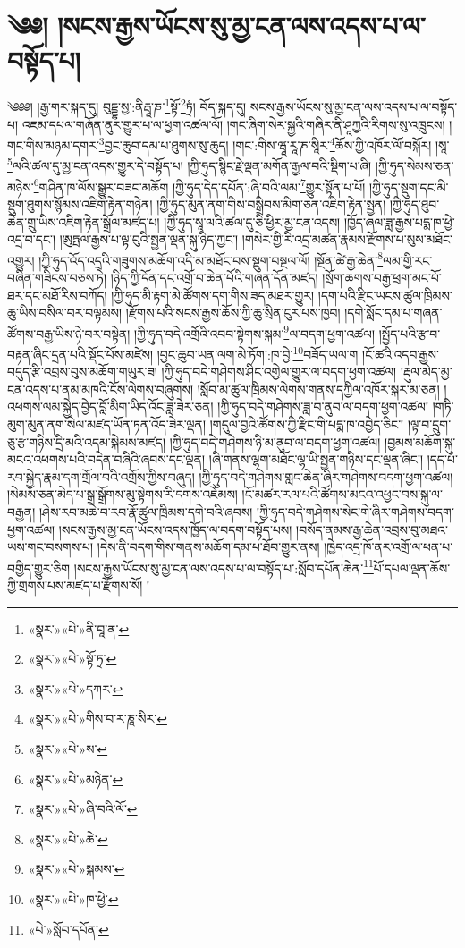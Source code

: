 \chapter{༄༅། །སངས་རྒྱས་ཡོངས་སུ་མྱ་ངན་ལས་འདས་པ་ལ་བསྟོད་པ།}༄༅༅། །རྒྱ་གར་སྐད་དུ། བུདྡྷ་སྱ་:ནིརྦཱ་ཎ་\footnote{«སྣར་»«པེ་»ནི་བཱ་ན་}སྟོ་\footnote{«སྣར་»«པེ་»སྟོ་ཏྲ་}ཏྲཾ། བོད་སྐད་དུ། སངས་རྒྱས་ཡོངས་སུ་མྱ་ངན་ལས་འདས་པ་ལ་བསྟོད་པ། འཇམ་དཔལ་གཞོན་ནུར་གྱུར་པ་ལ་ཕྱག་འཚལ་ལོ། །གང་ཞིག་སེར་སྐྱའི་གཞིར་ནི་ཤཱཀྱའི་རིགས་སུ་འཁྲུངས། །གང་གིས་མཉམ་དགར་\footnote{«སྣར་»«པེ་»དཀར་}བྱང་ཆུབ་དམ་པ་ཐུགས་སུ་ཆུད། །གང་:གིས་ཝཱ་རཱ་ཎ་སཱིར་\footnote{«སྣར་»«པེ་»གིས་བ་ར་ཎཱ་སིར་}ཆོས་ཀྱི་འཁོར་ལོ་བསྐོར། །སཱ་\footnote{«སྣར་»«པེ་»ས་}ལའི་ཚལ་དུ་མྱ་ངན་འདས་གྱུར་དེ་བསྟོད་པ། །ཀྱི་ཧུད་སྙིང་རྗེ་ལྡན་མགོན་རྒྱལ་བའི་སྡིག་པ་ཞི། །ཀྱི་ཧུད་སེམས་ཅན་མཉེས་\footnote{«སྣར་»«པེ་»མཉེན་}གཤིན་ཁ་ལོས་སྒྱུར་བཟང་མཆོག །ཀྱི་ཧུད་དེད་དཔོན་:ཞི་བའི་ལམ་\footnote{«སྣར་»«པེ་»ཞི་བའི་ལོ་}གྱུར་སྟོན་པ་པོ། །ཀྱི་ཧུད་སྡུག་དང་མི་སྡུག་ཐུགས་སྙོམས་འཇིག་རྟེན་གཉེན། །ཀྱི་ཧུད་མུན་ནག་གིས་བསྒྲིབས་མིག་ཅན་འཇིག་རྟེན་སྤྱན། །ཀྱི་ཧུད་ཐུབ་ཆེན་གྲུ་ཡིས་འཇིག་རྟེན་སྒྲོལ་མཛད་པ། །ཀྱི་ཧུད་སཱ་ལའི་ཚལ་དུ་ཅི་ཕྱིར་མྱ་ངན་འདས། །ཁྱོད་ཞལ་ཟླ་རྒྱས་པདྨ་ཁ་ཕྱེ་འདྲ་བ་དང་། །ཨུཏྤལ་རྒྱས་པ་ལྟ་བུའི་སྤྱན་ལྡན་སྐུ་ཉིད་ཀྱང་། །གསེར་གྱི་རི་འདྲ་མཚན་རྣམས་རྫོགས་པ་སུས་མཐོང་འགྱུར། །ཀྱི་ཧུད་འོད་འདྲའི་གཟུགས་མཆོག་འདི་མ་མཐོང་བས་སྡུག་བསྔལ་ལོ། །སྔོན་ཚེ་རྒྱ་ཆེན་\footnote{«སྣར་»«པེ་»ཆེ་}ལམ་གྱི་རང་བཞིན་གཟིངས་བཅས་ཏེ། །ཉིད་ཀྱི་དོན་དང་འགྲོ་བ་ཆེན་པོའི་གཞན་དོན་མཛད། །སྲོག་ཆགས་བརྒྱ་ཕྲག་མང་པོ་ཐར་དང་མཐོ་རིས་བཀོད། །ཀྱི་ཧུད་མི་རྟག་མེ་ཚོགས་དག་གིས་ཟད་མཐར་གྱུར། །དག་པའི་རྫིང་ཡངས་ཚུལ་ཁྲིམས་ཆུ་ཡིས་བསིལ་བར་བལྟམས། །རྫོགས་པའི་སངས་རྒྱས་ཆོས་ཀྱི་ཆུ་སྲིན་ངུར་པས་ཁྱབ། །དགེ་སློང་དམ་པ་གཞན་ཚོགས་བརྒྱ་ཡིས་ཉེ་བར་བསྟེན། །ཀྱི་ཧུད་བདེ་འགྲོའི་འབབ་སྟེགས་སྐམ་\footnote{«སྣར་»«པེ་»སྐམས་}ལ་བདག་ཕྱག་འཚལ། །སྤྱོད་པའི་རྩ་བ་བརྟན་ཞིང་དྲན་པའི་སྡོང་པོས་མཛེས། །བྱང་ཆུབ་ཡན་ལག་མེ་ཏོག་:ཁ་བྱེ་\footnote{«སྣར་»«པེ་»ཁ་ཕྱེ་}བཟོད་ཡལ་ག །ངོ་ཚའི་འདབ་རྒྱས་བདུད་རྩི་འབྲས་བུས་མཆོག་གཡུར་ཟ། །ཀྱི་ཧུད་བདེ་གཤེགས་ཤིང་འགྱེལ་གྱུར་ལ་བདག་ཕྱག་འཚལ། །རྡུལ་མེད་མྱ་ངན་འདས་པ་ནམ་མཁའི་ངོས་ལེགས་བཞུགས། །སློབ་མ་ཚུལ་ཁྲིམས་ལེགས་གནས་དཀྱིལ་འཁོར་སྐར་མ་ཅན། །འཕགས་ལམ་སྐྱེད་བྱེད་བློ་མིག་ཡིད་འོང་ཟླ་ཟེར་ཅན། །ཀྱི་ཧུད་བདེ་གཤེགས་ཟླ་བ་ནུབ་ལ་བདག་ཕྱག་འཚལ། །གཏི་མུག་མུན་ནག་སེལ་མཛད་ཡོན་ཏན་འོད་ཟེར་ལྡན། །གདུལ་བྱའི་ཚོགས་ཀྱི་རྫིང་གི་པདྨ་ཁ་འབྱེད་ཅིང་། །ལྟ་བ་དྲུག་ཅུ་རྩ་གཉིས་དྲི་མའི་འདམ་སྐེམས་མཛད། །ཀྱི་ཧུད་བདེ་གཤེགས་ཉི་མ་ནུབ་ལ་བདག་ཕྱག་འཚལ། །བྱམས་མཆོག་སྐུ་མངའ་འཕགས་པའི་བདེན་བཞིའི་ཞབས་དང་ལྡན། །ཞི་གནས་ལྷག་མཐོང་ལྷ་ཡི་སྤྱན་གཉིས་དང་ལྡན་ཞིང་། །དད་པ་རབ་སྐྱེད་རྣམ་དག་གྲོལ་བའི་འགྲོས་ཀྱིས་བཞུད། །ཀྱི་ཧུད་བདེ་གཤེགས་གླང་ཆེན་ཞིར་གཤེགས་བདག་ཕྱག་འཚལ། །སེམས་ཅན་མེད་པ་སྒྲ་སྒྲོགས་མུ་སྟེགས་རི་དགས་འཇོམས། །ངོ་མཚར་རལ་པའི་ཚོགས་མངའ་འཕྱང་བས་སྐུ་ལ་བརྒྱན། །ཤེས་རབ་མཆེ་བ་རབ་རྣོ་ཚུལ་ཁྲིམས་དགེ་བའི་ཞབས། །ཀྱི་ཧུད་བདེ་གཤེགས་སེང་གེ་ཞིར་གཤེགས་བདག་ཕྱག་འཚལ། །སངས་རྒྱས་མྱ་ངན་ཡོངས་འདས་ཁྱོད་ལ་བདག་བསྟོད་པས། །བསོད་ནམས་རྒྱ་ཆེན་འབྲས་བུ་མཐའ་ཡས་གང་བསགས་པ། །དེས་ནི་བདག་གིས་གནས་མཆོག་དམ་པ་ཐོབ་གྱུར་ནས། །ཁྱེད་འདྲ་ཁོ་ནར་འགྲོ་ལ་ཕན་པ་བགྱིད་གྱུར་ཅིག །སངས་རྒྱས་ཡོངས་སུ་མྱ་ངན་ལས་འདས་པ་ལ་བསྟོད་པ་:སློབ་དཔོན་ཆེན་\footnote{«པེ་»སློབ་དཔོན་}པོ་དཔལ་ལྡན་ཆོས་ཀྱི་གྲགས་པས་མཛད་པ་རྫོགས་སོ། ། 